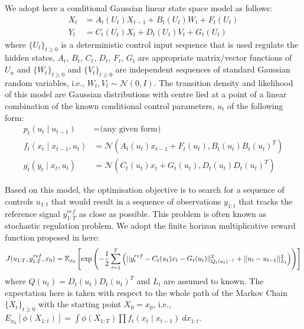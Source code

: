 We adopt here a conditional Gaussian linear state space model as follows:
\begin{align}
  X_t &= A_t(U_t)X_{t-1} + B_t(U_t)W_t + F_t(U_t) \nonumber \\
  Y_t &= C_t(U_t)X_t + D_t(U_t)V_t + G_t(U_t)
\label{eq:model}
\end{align}
where $\{U_t\}_{t \geq 0}$ is a deterministic control input sequence that is used regulate the hidden states, $A_t$, $B_t$, $C_t$, $D_t$, $F_t$, $G_t$ are appropriate matrix/vector functions of $U_n$ and  $\{W_t\}_{t \geq 0}$ and  $\{V_t\}_{t \geq 0}$ are independent sequences of standard Gaussian random variables, i.e., $W_t, V_t \sim \mathcal{N}(0,I)$. The transition density and likelihood of this model are Gaussian distributions with centre lied at a point of a linear combination of the known conditional control parameters, $u_t$ of the following form:
\begin{align}
  p_t(u_t \mid u_{t-1}) &= \textrm{(any given form)} \nonumber \\
  f_t(x_t \mid x_{t-1}, u_t) &= \mathcal{N}(A_t(u_t) x_{t-1} + F_t(u_t), B_t(u_t)B_t(u_t)^T) \nonumber \\
  g_t(y_t \mid x_t, u_t)    &= \mathcal{N}(C_t(u_t) x_t + G_t(u_t), D_t(u_t)D_t(u_t)^T)
\end{align}

Based on this model, the optimisation objective is to search for a sequence of controls $u_{1:t}$ that would result in a sequence of observations $y_{1:t}$ that tracks the reference signal $y^{ref}_{1:T}$ as close as possible. This problem is often known as stochastic regulation problem. We adopt the finite horizon multiplicative reward function proposed in \cite{NK11} here:
\begin{equation}
  J(u_{1:T},y^{ref}_{1:T}, x_0) = \operatorname{\mathbb{E}}_{x_0}\left[\exp\left( -\dfrac{1}{2}\displaystyle\sum^T_{t=1}\left(\vert\vert y^{ref}_t - C_t(u_t)x_t - G_t(u_t) \vert\vert^2_{Q_t(u_t)^{-1}}  + \vert\vert u_t - u_{t-1} \vert\vert^2_{L_t}\right) \right) \right]
\end{equation}
where $Q(u_t) = D_t(u_t)D_t(u_t)^T$ and $L_t$ are assumed to known. The expectation here is taken with respect to the whole path of the Markov Chain $\{X_t\}_{t \geq 0}$ with the starting point $X_0 = x_0$,  i.e., $E_{x_0}[\phi(X_{1:t})] = \displaystyle\int \phi(X_{1:T}) \prod f_t(x_t \mid x_{t-1})~dx_{1:t}$.


